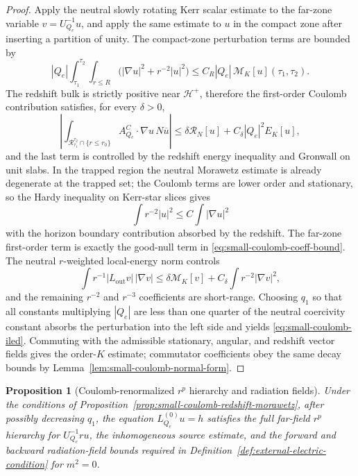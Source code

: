 \documentclass[11pt]{article}
\numberwithin{equation}{section}
\theoremstyle{plain}
\newtheorem{proposition}[theorem]{Proposition}
\theoremstyle{definition}
\theoremstyle{remark}
\begin{document}
\begin{proof}
Apply the neutral slowly rotating Kerr scalar estimate to the far-zone variable \(v=U_{Q_e}^{-1}u\), and apply the same estimate to \(u\) in the compact zone after inserting a partition of unity.  The compact-zone perturbation terms are bounded by
\begin{equation}
 |Q_e|\int_{\tau_1}^{\tau_2}\int_{r\le R}
 \bigl(|\nabla u|^2+r^{-2}|u|^2\bigr)
 \le C_R|Q_e|\,\mathcal M_K[u](\tau_1,\tau_2).
\end{equation}
The redshift bulk is strictly positive near \(\mathcal H^+\), therefore the first-order Coulomb contribution satisfies, for every \(\delta>0\),
\begin{equation}
 \left|\int_{\mathcal R_{\tau_1}^{\tau_2}\cap\{r\le r_0\}}
 A^C_{Q_e}\cdot\nabla u\,N\overline u\right|
 \le \delta\mathcal R_N[u]+C_\delta |Q_e|^2E_K[u],
\end{equation}
and the last term is controlled by the redshift energy inequality and Gronwall on unit slabs.  In the trapped region the neutral Morawetz estimate is already degenerate at the trapped set; the Coulomb terms are lower order and stationary, so the Hardy inequality on Kerr-star slices gives
\begin{equation}
 \int r^{-2}|u|^2\le C\int |\nabla u|^2
\end{equation}
with the horizon boundary contribution absorbed by the redshift.  The far-zone first-order term is exactly the good-null term in \eqref{eq:small-coulomb-coeff-bound}.  The neutral \(r\)-weighted local-energy norm controls
\begin{equation}
 \int r^{-1}|L_{\mathrm{out}}v|\,|\nabla v|
 \le \delta\mathcal M_K[v]+C_\delta\int r^{-2}|\nabla v|^2,
\end{equation}
and the remaining \(r^{-2}\) and \(r^{-3}\) coefficients are short-range.  Choosing \(q_1\) so that all constants multiplying \(|Q_e|\) are less than one quarter of the neutral coercivity constant absorbs the perturbation into the left side and yields \eqref{eq:small-coulomb-iled}.  Commuting with the admissible stationary, angular, and redshift vector fields gives the order-\(K\) estimate; commutator coefficients obey the same decay bounds by Lemma~\ref{lem:small-coulomb-normal-form}.
\end{proof}

\begin{proposition}[Coulomb-renormalized \(r^p\) hierarchy and radiation fields]\label{prop:small-coulomb-rp-radiation}
Under the conditions of Proposition~\ref{prop:small-coulomb-redshift-morawetz}, after possibly decreasing \(q_1\), the equation \(L_{Q_e}^{(0)}u=h\) satisfies the full far-field \(r^p\) hierarchy for \(U_{Q_e}^{-1}ru\), the inhomogeneous source estimate, and the forward and backward radiation-field bounds required in Definition~\ref{def:external-electric-condition} for \(m^2=0\).
\end{proposition}
\end{document}
